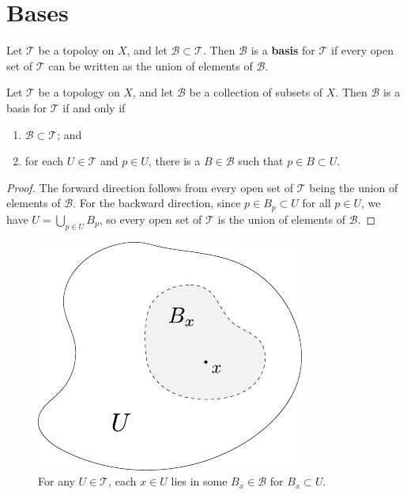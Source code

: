 \documentclass[10pt]{report}
\begin{document}

\section{Bases}

\begin{defn}
Let $\mathcal{T}$ be a topoloy on $X$, and let $\mathcal{B} \subset \mathcal{T}$. Then $\mathcal{B}$ is a \textbf{basis} for $\mathcal{T}$ if every open set of $\mathcal{T}$ can be written as the union of elements of $\mathcal{B}$.
\end{defn}

\begin{prop}
\label{prop:basis-specific-top}
Let $\mathcal{T}$ be a topology on $X$, and let $\mathcal{B}$ be a collection of subsets of $X$. Then $\mathcal{B}$ is a basis for $\mathcal{T}$ if and only if
\begin{enumerate}
	\item $\mathcal{B}\subset \mathcal{T}$; and
	\item for each $U \in \mathcal{T}$ and $p \in U$, there is a $B \in \mathcal{B}$ such that $p \in B \subset U$.
\end{enumerate}
\end{prop}
\begin{proof}
	The forward direction follows from every open set of $\mathcal{T}$ being the union of elements of $\mathcal{B}$. For the backward direction, since $p \in B_p \subset U$ for all $p \in U$, we have $U = \bigcup_{p\in U}B_p$, so every open set of $\mathcal{T}$ is the union of elements of $\mathcal{B}$. 
\end{proof}

\begin{figure}[H]
	\centering
	\includegraphics[scale=0.8]{fig/gen-top.pdf}
	\caption{For any $U \in \mathcal{T}$, each $x \in U$ lies in some $B_x \in \mathcal{B}$ for $B_x \subset U$.}
\end{figure}
\end{document}
